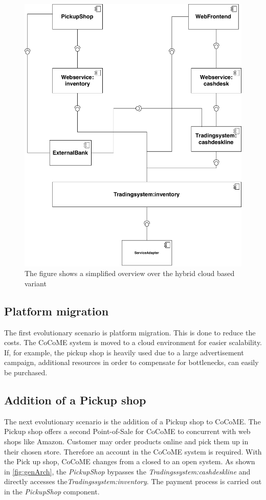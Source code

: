 \begin{figure}
\includegraphics[scale=.7]{logos/ArchPickupShop.pdf}
\caption{The figure shows a simplified overview over the hybrid cloud based variant}
\label{fig:genArch}
\end{figure}
\subsection{Platform migration}
The first evolutionary scenario is platform migration. This is done to reduce the costs. The CoCoME system is moved to a cloud environment for easier scalability. If, for example, the pickup shop is heavily used due to a large advertisement campaign, additional resources in order to compensate for bottlenecks, can easily be purchased.\\ 
\subsection{Addition of a Pickup shop}
\label{subsec:PS}
The next evolutionary scenario is the addition of a Pickup shop to CoCoME. The Pickup shop offers a second Point-of-Sale for CoCoME to concurrent with web shops like Amazon. Customer may order products online and pick them up in their chosen store. Therefore an account in the CoCoME system is required. With the Pick up shop, CoCoME changes from a closed to an open system. As shown in \autoref{fig:genArch}, the \textit{PickupShop} bypasses the  \textit{Tradingssystem:cashdeskline} and directly accesses the\textit{Tradingssystem:inventory}. The payment process is carried out in the \textit{PickupShop} component.

